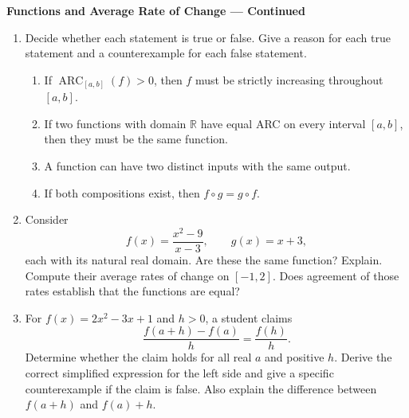 \documentclass[11pt]{article}
\begin{document}
\newpage
\begin{center}
  {\large\textbf{Functions and Average Rate of Change --- Continued}}
\end{center}

\begin{enumerate}[leftmargin=*,itemsep=0pt,resume]
  \item Decide whether each statement is true or false. Give a reason
  for each true statement and a counterexample for each false statement.
  \begin{enumerate}[label=(\alph*),leftmargin=1.6em,itemsep=0.25em]
    \item If $\operatorname{ARC}_{[a,b]}(f)>0$, then $f$ must be strictly
    increasing throughout $[a,b]$.
    \item If two functions with domain $\mathbb R$ have equal ARC on every
    interval $[a,b]$, then they must be the same function.
    \item A function can have two distinct inputs with the same output.
    \item If both compositions exist, then $f\circ g=g\circ f$.
  \end{enumerate}

  \item Consider
  \[
    f(x)=\frac{x^2-9}{x-3},\qquad g(x)=x+3,
  \]
  each with its natural real domain. Are these the same function?
  Explain. Compute their average rates of change on $[-1,2]$.
  Does agreement of those rates establish that the functions are equal?

  \item For $f(x)=2x^2-3x+1$ and $h>0$, a student claims
  \[
    \frac{f(a+h)-f(a)}{h}=\frac{f(h)}{h}.
  \]
  Determine whether the claim holds for all real $a$ and positive $h$.
  Derive the correct simplified expression for the left side and give a
  specific counterexample if the claim is false. Also explain the
  difference between $f(a+h)$ and $f(a)+h$.
\end{enumerate}
\end{document}
